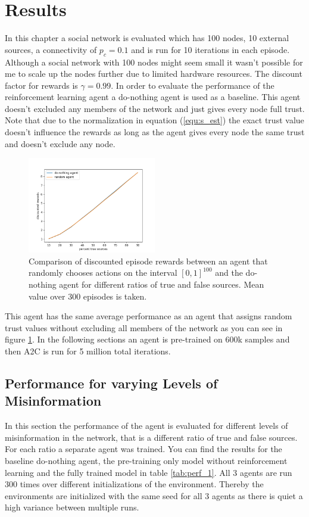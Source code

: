 \documentclass[11pt, a4paper]{article}
\begin{document}
\section{Results} \label{sec:results}
In this chapter a social network is evaluated which has 100 nodes, 10 external sources, a connectivity of $p_c=0.1$ and is run for 10 iterations in each episode. Although a social network with 100 nodes might seem small it wasn't possible for me to scale up the nodes further due to limited hardware resources. The discount factor for rewards is $\gamma=0.99$. In order to evaluate the performance of the reinforcement learning agent a do-nothing agent is used as a baseline. This agent doesn't excluded any members of the network and just gives every node full trust. Note that due to the normalization in equation (\ref{equ:s_est}) the exact trust value doesn't influence the rewards as long as the agent gives every node the same trust and doesn't exclude any node.

\begin{figure}[h] 
	\centering
	\includegraphics[width=0.5\textwidth]{comp_dnA_randomA.png} 
	\caption{\label{fig:comp_dnA_randomA} Comparison of discounted episode rewards between an agent that randomly chooses actions on the interval $[0,1]^{100}$ and the do-nothing agent for different ratios of true and false sources. Mean value over 300 episodes is taken.}
\end{figure}

This agent has the same average performance as an agent that assigns random trust values without excluding all members of the network as you can see in figure \ref{fig:comp_dnA_randomA}. \newline
In the following sections an agent is pre-trained on 600k samples and then A2C is run for 5 million total iterations.

\subsection{Performance for varying Levels of Misinformation}
In this section the performance of the agent is evaluated for different levels of misinformation in the network, that is a different ratio of true and false sources. For each ratio a separate agent was trained. You can find the results for the baseline do-nothing agent, the pre-training only model without reinforcement learning and the fully trained model in table \ref{tab:perf_1}. All 3 agents are run 300 times over different initializations of the environment. Thereby the environments are initialized with the same seed for all 3 agents as there is quiet a high variance between multiple runs.
\end{document}

